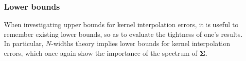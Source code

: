 \documentclass[twoside,11pt]{book}
\numberwithin{theorem}{chapter}
\numberwithin{definition}{chapter}
\numberwithin{proposition}{chapter}
\numberwithin{corollary}{chapter}
\numberwithin{example}{chapter}
\numberwithin{lemma}{chapter}
\DeclareMathOperator{\X}{\mathcal{X}}
\newcommand{\pc}[1]{\textcolor{blue}{#1}}
\newcommand{\rb}[1]{\textcolor{magenta}{#1}}
\begin{document}
%



\subsubsection{Lower bounds}\label{sec:lower_bounds}
When investigating upper bounds for kernel interpolation errors, it is useful to remember existing lower bounds, so as to evaluate the tightness of one's results. In particular, $N$-widths theory \citep{Pin12} implies lower bounds for kernel interpolation errors, which once again show the importance of the spectrum of $\bm{\Sigma}$.
\end{document}
